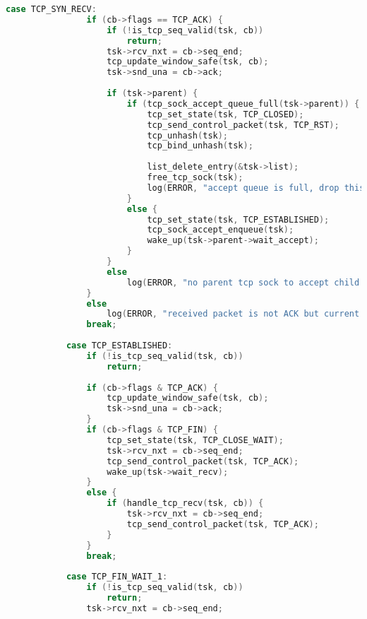 \documentclass[UTF8]{report}
\begin{document}
\begin{lstlisting}[language=C]
            case TCP_SYN_RECV:
                if (cb->flags == TCP_ACK) {
                    if (!is_tcp_seq_valid(tsk, cb))
                        return;
                    tsk->rcv_nxt = cb->seq_end;
                    tcp_update_window_safe(tsk, cb);
                    tsk->snd_una = cb->ack;
    
                    if (tsk->parent) {
                        if (tcp_sock_accept_queue_full(tsk->parent)) {
                            tcp_set_state(tsk, TCP_CLOSED);
                            tcp_send_control_packet(tsk, TCP_RST);
                            tcp_unhash(tsk);
                            tcp_bind_unhash(tsk);
    
                            list_delete_entry(&tsk->list);
                            free_tcp_sock(tsk);
                            log(ERROR, "accept queue is full, drop this connection.");
                        } 
                        else {
                            tcp_set_state(tsk, TCP_ESTABLISHED);
                            tcp_sock_accept_enqueue(tsk);
                            wake_up(tsk->parent->wait_accept);
                        }
                    }
                    else
                        log(ERROR, "no parent tcp sock to accept child connection.");
                }
                else
                    log(ERROR, "received packet is not ACK but current state is SYN_RECV, drop it.");
                break;
    
            case TCP_ESTABLISHED:
                if (!is_tcp_seq_valid(tsk, cb))
                    return;
    
                if (cb->flags & TCP_ACK) {
                    tcp_update_window_safe(tsk, cb);
                    tsk->snd_una = cb->ack;
                }
                if (cb->flags & TCP_FIN) {
                    tcp_set_state(tsk, TCP_CLOSE_WAIT);
                    tsk->rcv_nxt = cb->seq_end;
                    tcp_send_control_packet(tsk, TCP_ACK);
                    wake_up(tsk->wait_recv);
                }
                else {
                    if (handle_tcp_recv(tsk, cb)) {
                        tsk->rcv_nxt = cb->seq_end;
                        tcp_send_control_packet(tsk, TCP_ACK);
                    }
                }
                break;
            
            case TCP_FIN_WAIT_1:
                if (!is_tcp_seq_valid(tsk, cb))
                    return;
                tsk->rcv_nxt = cb->seq_end;
    

\end{lstlisting}
\end{document}
